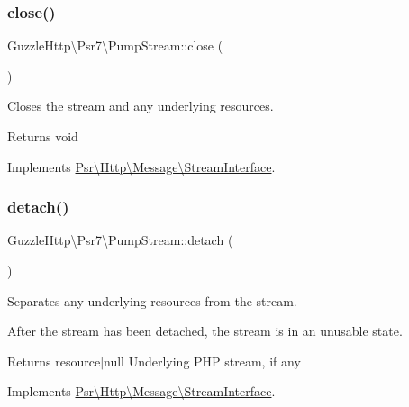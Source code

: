 \subsubsection{\texorpdfstring{close()}{close()}}
{\footnotesize\ttfamily Guzzle\+Http\textbackslash{}\+Psr7\textbackslash{}\+Pump\+Stream\+::close (\begin{DoxyParamCaption}{ }\end{DoxyParamCaption})}

Closes the stream and any underlying resources.

\begin{DoxyReturn}{Returns}
void 
\end{DoxyReturn}


Implements \hyperlink{interfacePsr_1_1Http_1_1Message_1_1StreamInterface_a0bbd0c821da0ee0c319f9867ff77c598}{Psr\textbackslash{}\+Http\textbackslash{}\+Message\textbackslash{}\+Stream\+Interface}.

\mbox{\label{classGuzzleHttp_1_1Psr7_1_1PumpStream_a6e913458fb2c2b7ca51f600d466dcc19}} 
\subsubsection{\texorpdfstring{detach()}{detach()}}
{\footnotesize\ttfamily Guzzle\+Http\textbackslash{}\+Psr7\textbackslash{}\+Pump\+Stream\+::detach (\begin{DoxyParamCaption}{ }\end{DoxyParamCaption})}

Separates any underlying resources from the stream.

After the stream has been detached, the stream is in an unusable state.

\begin{DoxyReturn}{Returns}
resource$\vert$null Underlying P\+HP stream, if any 
\end{DoxyReturn}


Implements \hyperlink{interfacePsr_1_1Http_1_1Message_1_1StreamInterface_a1670dba880a8c14690746732960d4c9c}{Psr\textbackslash{}\+Http\textbackslash{}\+Message\textbackslash{}\+Stream\+Interface}.

\mbox{\label{classGuzzleHttp_1_1Psr7_1_1PumpStream_a1a319d252ffe5ca8ee0afd4248bbc21d}} 
